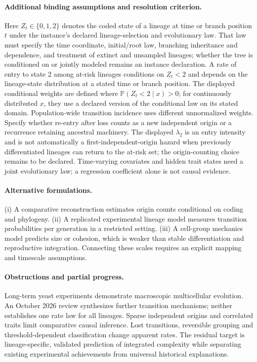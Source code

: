 \documentclass[11pt]{article}
\begin{document}
\paragraph{Additional binding assumptions and resolution criterion.} Here $Z_t\in\{0,1,2\}$ denotes the coded state of a lineage at time or branch position $t$ under the instance's declared lineage-selection and evolutionary law. That law must specify the time coordinate, initial/root law, branching inheritance and dependence, and treatment of extinct and unsampled lineages; whether the tree is conditioned on or jointly modeled remains an instance declaration. A rate of entry to state 2 among at-risk lineages conditions on $Z_t<2$ and depends on the lineage-state distribution at a stated time or branch position. The displayed conditional weights are defined where $\mathbb{P}(Z_t<2\mid x)>0$; for continuously distributed $x$, they use a declared version of the conditional law on its stated domain. Population-wide transition incidence uses different unnormalized weights. Specify whether re-entry after loss counts as a new independent origin or a recurrence retaining ancestral machinery. The displayed $\lambda_2$ is an entry intensity and is not automatically a first-independent-origin hazard when previously differentiated lineages can return to the at-risk set; the origin-counting choice remains to be declared. Time-varying covariates and hidden trait states need a joint evolutionary law; a regression coefficient alone is not causal evidence.

\paragraph{Alternative formulations.} (i) A comparative reconstruction estimates origin counts conditional on coding and phylogeny. (ii) A replicated experimental lineage model measures transition probabilities per generation in a restricted setting. (iii) A cell-group mechanics model predicts size or cohesion, which is weaker than stable differentiation and reproductive integration. Connecting these scales requires an explicit mapping and timescale assumptions.

\paragraph{Obstructions and partial progress.} Long-term yeast experiments demonstrate macroscopic multicellular evolution. An October 2026 review synthesizes further transition mechanisms; neither establishes one rate law for all lineages. Sparse independent origins and correlated traits limit comparative causal inference. Lost transitions, reversible grouping and threshold-dependent classification change apparent rates. The residual target is lineage-specific, validated prediction of integrated complexity while separating existing experimental achievements from universal historical explanations.
\end{document}
